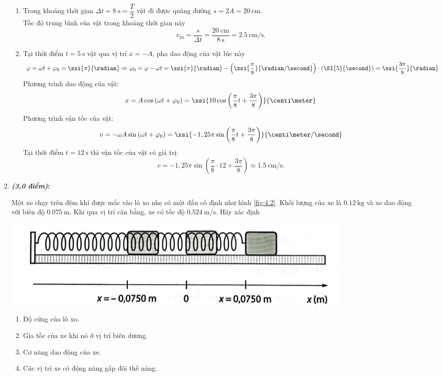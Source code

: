 \begin{enumerate}[label=\bfseries Câu \arabic*]
{\begin{enumerate}[label=\alph*)]
	$$\omega=\dfrac{2\pi}{T}=\xsi{\dfrac{\pi}{8}}{\radian/\second}$$
	\item Trong khoảng thời gian $\Delta t=\SI{8}{\second}=\dfrac{T}{2}$ vật đi được quãng đường $s=2A=\SI{20}{\centi\meter}$.\\
	Tốc độ trung bình của vật trong khoảng thời gian này
	$$v_\text{tb}=\dfrac{s}{\Delta t}=\dfrac{\SI{20}{\centi\meter}}{\SI{8}{\second}}=\SI{2.5}{\centi\meter/\second}.$$
	\item Tại thời điểm $t=\SI{5}{\second}$ vật qua vị trí $x=-A$, pha dao động của vật lúc này
	$$\varphi=\omega t+\varphi_0=\xsi{\pi}{\radian}\Rightarrow \varphi_0=\varphi-\omega t=\xsi{\pi}{\radian} -\left(\xsi{\dfrac{\pi}{8}}{\radian/\second}\right)\cdot\left(\SI{5}{\second}\right)=\xsi{\dfrac{3\pi}{8}}{\radian}$$
	Phương trình dao động của vật:
	$$x=A\cos\left(\omega t+\varphi_0\right)=\xsi{10\cos\left(\dfrac{\pi}{8}t+\dfrac{3\pi}{8}\right)}{\centi\meter}$$
	Phương trình vận tốc của vật:
	$$v=-\omega A\sin\left(\omega t+\varphi_0\right)=\xsi{-1,25\pi\sin\left(\dfrac{\pi}{8}t+\dfrac{3\pi}{8}\right)}{\centi\meter/\second}$$
	Tại thời điểm $t=\SI{12}{\second}$ thì vận tốc của vật có giá trị:
	$$v=-1,25\pi\sin\left(\dfrac{\pi}{8}\cdot12+\dfrac{3\pi}{8}\right)\approx\SI{1.5}{\centi\meter/\second}.$$
\end{enumerate}
}
\item \textbf{\textit{(3,0 điểm)}:}\\ {Một xe chạy trên đệm khí được mắc vào lò xo nhẹ có một đầu cố định như hình \ref{fig:4.2}. Khối lượng của xe là $\SI{0.12}{\kilogram}$ và xe dao động với biên độ $\SI{0.075}{\meter}$. Khi qua vị trí cân bằng, xe có tốc độ $\SI{0.524}{\meter/\second}$. Hãy xác định
\begin{center}
	\includegraphics[width=0.7\linewidth]{../figs/D11-4-3}
	\label{fig:4.2}
\end{center}
\begin{enumerate}[label=\alph*)]
	\item Độ cứng của lò xo.
	\item Gia tốc của xe khi nó ở vị trí biên dương.
	\item Cơ năng dao động của xe.
	\item Các vị trí xe có động năng gấp đôi thế năng.

\end{enumerate}}
\end{enumerate}
